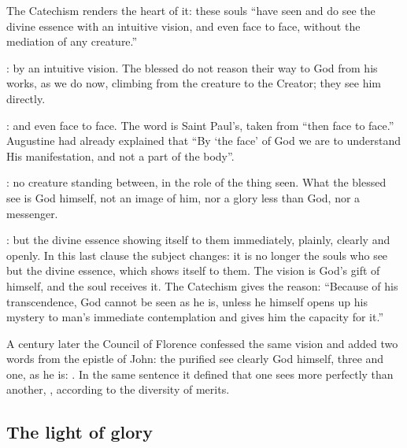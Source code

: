 The Catechism renders the heart of it: these souls ``have seen and do see the divine essence with an intuitive vision, and even face to face, without the mediation of any creature.''

: by an intuitive vision. The blessed do not reason their way to God from his works, as we do now, climbing from the creature to the Creator; they see him directly.

: and even face to face. The word is Saint Paul's, taken from ``then face to face.'' Augustine had already explained that ``By `the face' of God we are to understand His manifestation, and not a part of the body''.

: no creature standing between, in the role of the thing seen. What the blessed see is God himself, not an image of him, nor a glory less than God, nor a messenger.

: but the divine essence showing itself to them immediately, plainly, clearly and openly. In this last clause the subject changes: it is no longer the souls who see but the divine essence, which shows itself to them. The vision is God's gift of himself, and the soul receives it. The Catechism gives the reason: ``Because of his transcendence, God cannot be seen as he is, unless he himself opens up his mystery to man's immediate contemplation and gives him the capacity for it.''

A century later the Council of Florence confessed the same vision and added two words from the epistle of John: the purified see clearly God himself, three and one, as he is: . In the same sentence it defined that one sees more perfectly than another, , according to the diversity of merits.

\subsection{The light of glory}

